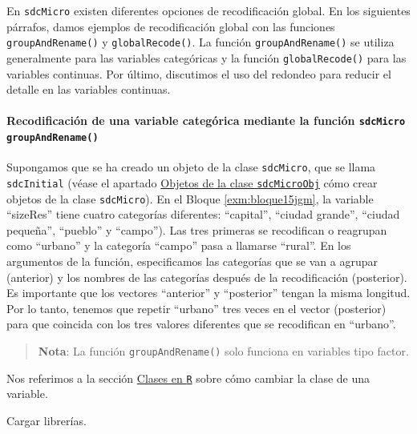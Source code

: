 \documentclass[]{book}
\let\oldparagraph\paragraph
\renewcommand{\paragraph}[1]{\oldparagraph{#1}\mbox{}}
\theoremstyle{definition}
\theoremstyle{definition}
\theoremstyle{definition}
\theoremstyle{definition}
\theoremstyle{remark}
\begin{document}
En \texttt{sdcMicro} existen diferentes opciones de recodificación global. En los siguientes párrafos, damos ejemplos de recodificación global con las funciones \texttt{groupAndRename()} y \texttt{globalRecode()}. La función \texttt{groupAndRename()} se utiliza generalmente para las variables categóricas y la función \texttt{globalRecode()} para las variables continuas. Por último, discutimos el uso del redondeo para reducir el detalle en las variables continuas.

\hypertarget{recodificaciuxf3n-de-una-variable-categuxf3rica-mediante-la-funciuxf3n-sdcmicro-groupandrename}{%
\paragraph{\texorpdfstring{Recodificación de una variable categórica mediante la función \texttt{sdcMicro} \texttt{groupAndRename()}}{Recodificación de una variable categórica mediante la función sdcMicro groupAndRename()}}\label{recodificaciuxf3n-de-una-variable-categuxf3rica-mediante-la-funciuxf3n-sdcmicro-groupandrename}}

Supongamos que se ha creado un objeto de la clase \texttt{sdcMicro}, que se llama \texttt{sdcInitial} (véase el apartado \protect\hyperlink{objetos-de-la-clase-sdcmicroobj}{Objetos de la clase \texttt{sdcMicroObj}} cómo crear objetos de la clase \texttt{sdcMicro}). En el Bloque \ref{exm:bloque15jgm}, la variable ``sizeRes'' tiene cuatro categorías diferentes: ``capital'', ``ciudad grande'', ``ciudad pequeña'', ``pueblo'' y ``campo''). Las tres primeras se recodifican o reagrupan como ``urbano'' y la categoría ``campo'' pasa a llamarse ``rural''. En los argumentos de la función, especificamos las categorías que se van a agrupar (anterior) y los nombres de las categorías después de la recodificación (posterior). Es importante que los vectores ``anterior'' y ``posterior'' tengan la misma longitud. Por lo tanto, tenemos que repetir ``urbano'' tres veces en el vector (posterior) para que coincida con los tres valores diferentes que se recodifican en ``urbano''.

\begin{quote}
\textbf{Nota}: La función \texttt{groupAndRename()} solo funciona en variables tipo factor.
\end{quote}

Nos referimos a la sección \protect\hyperlink{clases-en-r}{Clases en \texttt{R}} sobre cómo cambiar la clase de una variable.

Cargar librerías.
\end{document}
